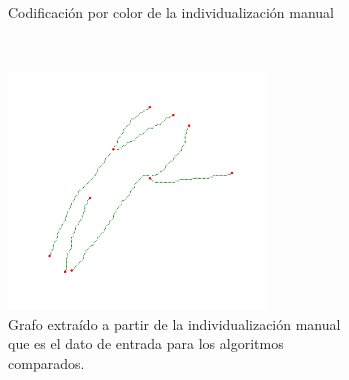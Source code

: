 \begin{figure}[h!]
\begin{subfigure}[t]{0.49\textwidth}
        \caption{Codificaci\'on por color de la individualizaci\'on manual}
        \label{fig:field3t0filtered2-indivManual}
    \end{subfigure}
    ~
    \begin{subfigure}[t]{0.49\textwidth}
        \centering
        \includegraphics[height=2.5in]{benchImages/field3-t0-2cellBcrop-filtered-2-graph-thick.png}
        \caption{Grafo extra\'ido a partir de la individualizaci\'on manual que es el dato de entrada para los algoritmos comparados.}
        \label{fig:field3t0filtered2-graph}
    \end{subfigure}
    \caption{}
    \label{fig:field3t0filtered2}
\end{figure}